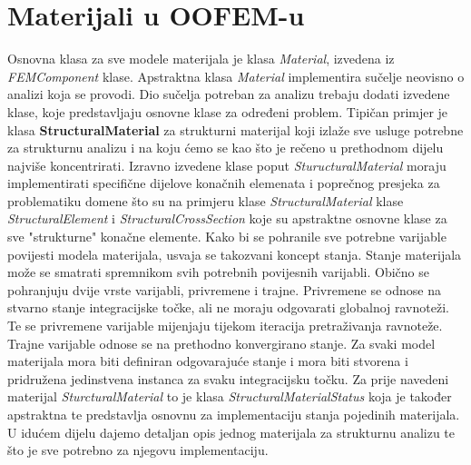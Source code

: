 \documentclass[a4paper,twoside,12pt]{memoir} %
\begin{document}
\section{Materijali u OOFEM-u}
\label{poglavlje:materials_in_oofem}
Osnovna klasa za sve modele materijala je klasa \textit{Material}, izvedena iz \textit{FEMComponent} klase. Apstraktna klasa \textit{Material} implementira sučelje neovisno o analizi koja se provodi. Dio sučelja potreban za analizu trebaju dodati izvedene klase, koje predstavljaju osnovne klase za određeni problem. Tipičan primjer je klasa \textbf{StructuralMaterial} za strukturni materijal koji izlaže sve usluge potrebne za strukturnu analizu i na koju ćemo se kao što je rečeno u prethodnom dijelu najviše koncentrirati. Izravno izvedene klase poput \textit{SturucturalMaterial} moraju implementirati specifične dijelove konačnih elemenata i poprečnog presjeka za problematiku domene što su na primjeru klase \textit{StructuralMaterial} klase \textit{StructuralElement} i \textit{StructuralCrossSection} koje su apstraktne osnovne klase za sve "strukturne" konačne elemente.
Kako bi se pohranile sve potrebne varijable povijesti modela materijala, usvaja se takozvani koncept stanja. Stanje materijala može se smatrati spremnikom svih potrebnih povijesnih varijabli. Obično se pohranjuju dvije vrste varijabli, privremene i trajne. Privremene se odnose na stvarno stanje integracijske točke, ali ne moraju odgovarati globalnoj ravnoteži. Te se privremene varijable mijenjaju tijekom iteracija pretraživanja ravnoteže. Trajne varijable odnose se na prethodno konvergirano stanje. Za svaki model materijala mora biti definiran odgovarajuće stanje i mora biti stvorena i pridružena jedinstvena instanca za svaku integracijsku točku. Za prije navedeni materijal \textit{SturcturalMaterial} to je klasa \textit{StructuralMaterialStatus} koja je također apstraktna te predstavlja osnovnu za implementaciju stanja pojedinih materijala. U idućem dijelu dajemo detaljan opis jednog materijala za strukturnu analizu te što je sve potrebno za njegovu implementaciju.
\end{document}
